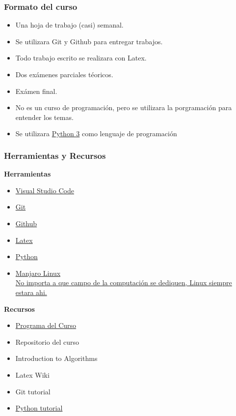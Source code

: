 \documentclass{beamer}
\begin{document}
\begin{frame}
    \frametitle{Formato del curso}
    \begin{itemize}
        \item{Una hoja de trabajo (casi) semanal.}
        \item{Se utilizara Git y Github para entregar trabajos.}
        \item{Todo trabajo escrito se realizara con Latex.}
        \item{Dos ex\'amenes parciales t\'eoricos.}
        \item{Ex\'amen final.}
        \item{No es un curso de programaci\'on, pero
        se utilizara la porgramaci\'on para entender los temas.}
        \item{Se utilizara \href{https://www.python.org/}{Python 3} como lenguaje de programaci\'on}
    \end{itemize}
\end{frame}

\begin{frame}
\frametitle{Herramientas y Recursos}
\begin{multicols*}{2}
    {\bf Herramientas} \\
\begin{itemize}
    \item \href{https://code.visualstudio.com/}{Visual Studio Code}
    \item \href{https://git-scm.com/}{Git}
    \item \href{https://github.com/}{Github}
    \item \href{https://www.latex-project.org/}{Latex}
    \item \href{https://www.python.org/}{Python}
    \item \href{https://manjaro.org/}{Manjaro Linux\\
    \tiny{No importa a que campo de la computaci\'on se dediquen,
        Linux siempre estara ahi.}}
\end{itemize}
\columnbreak
{\bf Recursos}
\begin{itemize}
    \item{\href{http://x.com}{Programa del Curso}}
    \item{Repositorio del curso \cite{Repositorio}}
    \item{Introduction to Algorithms \cite{Algoritmos}}
    \item Latex Wiki \cite{Latex}
    \item Git tutorial \cite{GitTutorial}
    \item{\href{https://docs.python.org/3/tutorial/index.html}{Python tutorial}}
\end{itemize}
\end{multicols*}
\end{frame}
\end{document}
